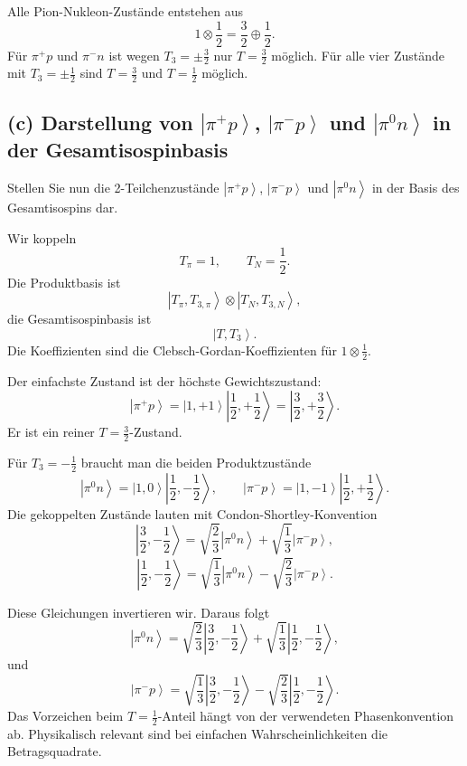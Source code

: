 \documentclass[11pt,a4paper]{scrartcl}
\newcommand{\ket}[1]{\left|#1\right\rangle}
\begin{document}
\begin{answerbox}
Alle Pion-Nukleon-Zustände entstehen aus
\[
1\otimes \frac12=\frac32\oplus\frac12.
\]
Für $\pi^+p$ und $\pi^-n$ ist wegen $T_3=\pm\frac32$ nur $T=\frac32$ möglich. Für alle vier Zustände mit $T_3=\pm\frac12$ sind $T=\frac32$ und $T=\frac12$ möglich.
\end{answerbox}

\subsection*{(c) Darstellung von $\ket{\pi^+p}$, $\ket{\pi^-p}$ und $\ket{\pi^0n}$ in der Gesamtisospinbasis}

Stellen Sie nun die 2-Teilchenzustände $\ket{\pi^+p}$, $\ket{\pi^-p}$ und $\ket{\pi^0n}$ in der Basis des Gesamtisospins dar.

\begin{calculationbox}
Wir koppeln
\[
T_\pi=1,
\qquad
T_N=\frac12.
\]
Die Produktbasis ist
\[
\ket{T_\pi,T_{3,\pi}}\otimes\ket{T_N,T_{3,N}},
\]
die Gesamtisospinbasis ist
\[
\ket{T,T_3}.
\]
Die Koeffizienten sind die Clebsch-Gordan-Koeffizienten für $1\otimes\frac12$.

\begin{calculationbox}
Der einfachste Zustand ist der höchste Gewichtszustand:
\[
\ket{\pi^+p}
=\ket{1,+1}\ket{\frac12,+\frac12}
=\boxed{\ket{\frac32,+\frac32}}.
\]
Er ist ein reiner $T=\frac32$-Zustand.
\end{calculationbox}

\begin{calculationbox}
Für $T_3=-\frac12$ braucht man die beiden Produktzustände
\[
\ket{\pi^0n}=\ket{1,0}\ket{\frac12,-\frac12},
\qquad
\ket{\pi^-p}=\ket{1,-1}\ket{\frac12,+\frac12}.
\]
Die gekoppelten Zustände lauten mit Condon-Shortley-Konvention
\[
\ket{\frac32,-\frac12}
=\sqrt{\frac23}\ket{\pi^0n}
+\sqrt{\frac13}\ket{\pi^-p},
\]
\[
\ket{\frac12,-\frac12}
=\sqrt{\frac13}\ket{\pi^0n}
-\sqrt{\frac23}\ket{\pi^-p}.
\]
\end{calculationbox}

\begin{calculationbox}
Diese Gleichungen invertieren wir. Daraus folgt
\[
\boxed{
\ket{\pi^0n}
=\sqrt{\frac23}\ket{\frac32,-\frac12}
+\sqrt{\frac13}\ket{\frac12,-\frac12}}
,
\]
und
\[
\boxed{
\ket{\pi^-p}
=\sqrt{\frac13}\ket{\frac32,-\frac12}
-\sqrt{\frac23}\ket{\frac12,-\frac12}}
.
\]
Das Vorzeichen beim $T=\frac12$-Anteil hängt von der verwendeten Phasenkonvention ab. Physikalisch relevant sind bei einfachen Wahrscheinlichkeiten die Betragsquadrate.
\end{calculationbox}
\end{calculationbox}
\end{document}
